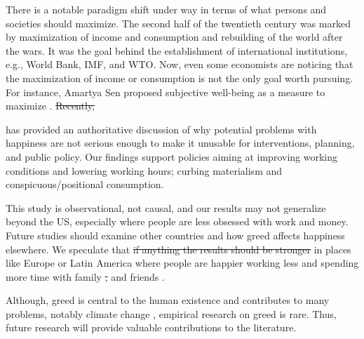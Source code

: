 \documentclass[10pt, letterpaper]{article}
\providecommand{\DIFaddtex}[1]{{\protect\color{blue}\uwave{#1}}} %
\providecommand{\DIFdeltex}[1]{{\protect\color{red}\sout{#1}}}                      %
\providecommand{\DIFaddbegin}{} %
\providecommand{\DIFaddend}{} %
\providecommand{\DIFdelbegin}{} %
\providecommand{\DIFdelend}{} %
\providecommand{\DIFadd}[1]{\texorpdfstring{\DIFaddtex{#1}}{#1}} %
\providecommand{\DIFdel}[1]{\texorpdfstring{\DIFdeltex{#1}}{}} %
\newcommand{\DIFscaledelfig}{0.5}
\newlength{\DIFdelgraphicswidth} %
\newlength{\DIFdelgraphicsheight} %
\newcommand{\DIFaddincludegraphics}[2][]{{\color{blue}\fbox{\DIFOincludegraphics[#1]{#2}}}} %
\newcommand{\DIFdelincludegraphics}[2][]{%
\sbox{\DIFdelgraphicsbox}{\DIFOincludegraphics[#1]{#2}}%
\settoboxwidth{\DIFdelgraphicswidth}{\DIFdelgraphicsbox} %
\settoboxtotalheight{\DIFdelgraphicsheight}{\DIFdelgraphicsbox} %
\scalebox{\DIFscaledelfig}{%
\parbox[b]{\DIFdelgraphicswidth}{\usebox{\DIFdelgraphicsbox}\\[-\baselineskip] \rule{\DIFdelgraphicswidth}{0em}}\llap{\resizebox{\DIFdelgraphicswidth}{\DIFdelgraphicsheight}{%
\setlength{\unitlength}{\DIFdelgraphicswidth}%
\begin{picture}(1,1)%
\thicklines\linethickness{2pt} %
{\color[rgb]{1,0,0}\put(0,0){\framebox(1,1){}}}%
{\color[rgb]{1,0,0}\put(0,0){\line( 1,1){1}}}%
{\color[rgb]{1,0,0}\put(0,1){\line(1,-1){1}}}%
\end{picture}%
}\hspace*{3pt}}} %
} %
\DeclareRobustCommand{\DIFaddbegin}{\DIFOaddbegin \let\includegraphics\DIFaddincludegraphics} %
\DeclareRobustCommand{\DIFaddend}{\DIFOaddend \let\includegraphics\DIFOincludegraphics} %
\DeclareRobustCommand{\DIFdelbegin}{\DIFOdelbegin \let\includegraphics\DIFdelincludegraphics} %
\DeclareRobustCommand{\DIFdelend}{\DIFOaddend \let\includegraphics\DIFOincludegraphics} %
\begin{document}
\begin{spacing}{1.8}
There is a notable paradigm shift under way in terms of what persons and
societies should maximize. The second half of the twentieth century was marked
by maximization of income and consumption and rebuilding of the world after the
wars. It was the goal behind the establishment of international institutions,
e.g., World Bank, IMF, and WTO. Now, even some economists are noticing that the maximization of income or consumption is not the only goal worth pursuing. For instance, Amartya Sen proposed subjective well-being as a measure to maximize \citep{stiglitz09al}. 
\DIFdelbegin \DIFdel{Recently, }\DIFdelend \DIFaddbegin 

\DIFaddend \citet{diener09} has provided an authoritative  
discussion of why potential problems with happiness are not serious enough to make it unusable for interventions, planning, and public policy.  
%
Our findings support policies aiming at improving working conditions and lowering working hours; curbing materialism and conspicuous/positional consumption. 

This study is observational, not causal, and our results may not generalize beyond the US, especially where people are less obsessed with work and money. 
%
Future studies should examine other countries and how greed affects happiness
elsewhere. We speculate that \DIFdelbegin \DIFdel{if anything the results should be stronger }\DIFdelend \DIFaddbegin \DIFadd{the results may hold }\DIFaddend in places like Europe or Latin America where people are happier working less and spending more time with family \DIFdelbegin \DIFdel{, }\DIFdelend and friends \citep{valente16,valente15,aokditella}.  

Although, greed is central to the human existence and contributes to many problems, notably climate change \citep[e.g.,][]{okulicz19}, empirical research on greed is rare. Thus, future research will provide valuable contributions to the literature. 



\end{spacing}
\end{document}
